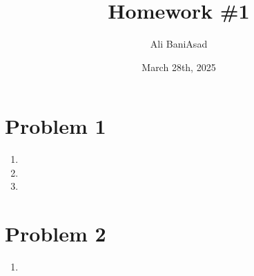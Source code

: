 \documentclass[12]{fphw}
\title{Homework \#1} %
\author{Ali BaniAsad} %
\date{March 28th, 2025} %
\institute{Sharif University of Technology \\ Institute of Aerospace} %
\begin{document}
\maketitle %
\section*{Problem 1}

\begin{enumerate}[label=(\alph*)]
	\item 
	
	\newpage
	\item 
	
	\newpage
	\item 
	
\end{enumerate}
\newpage
\section*{Problem 2}

\begin{enumerate}[label=(\alph*)]
	\item 
	
\end{enumerate}
\end{document}
